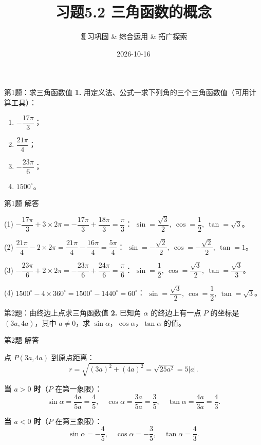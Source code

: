 \documentclass[10pt,aspectratio=169,serif]{beamer}
\title[习题5.2]{习题5.2 三角函数的概念}
\subtitle{复习巩固 \& 综合运用 \& 拓广探索}
\author{}
\institute{}
\date{2026-10-16}
\begin{document}
\begin{frame}
  \titlepage
\end{frame}

\begin{frame}[t]{第1题：求三角函数值}
\textbf{1.} 用定义法、公式一求下列角的三个三角函数值（可用计算工具）：
\begin{enumerate}
  \item $-\dfrac{17\pi}{3}$；
  \item $\dfrac{21\pi}{4}$；
  \item $-\dfrac{23\pi}{6}$；
  \item $1500^\circ$。
\end{enumerate}
\end{frame}

\begin{frame}[t]{第1题 解答}
\begin{tcolorbox}[colback=orange!10,colframe=orange,title=\textbf{解}]
\small
(1) $-\dfrac{17\pi}{3}+3\times 2\pi=-\dfrac{17\pi}{3}+\dfrac{18\pi}{3}=\dfrac{\pi}{3}$：
$\sin=\dfrac{\sqrt{3}}{2},\ \cos=\dfrac{1}{2},\ \tan=\sqrt{3}$。

(2) $\dfrac{21\pi}{4}-2\times 2\pi=\dfrac{21\pi}{4}-\dfrac{16\pi}{4}=\dfrac{5\pi}{4}$：
$\sin=-\dfrac{\sqrt{2}}{2},\ \cos=-\dfrac{\sqrt{2}}{2},\ \tan=1$。

(3) $-\dfrac{23\pi}{6}+2\times 2\pi=-\dfrac{23\pi}{6}+\dfrac{24\pi}{6}=\dfrac{\pi}{6}$：
$\sin=\dfrac{1}{2},\ \cos=\dfrac{\sqrt{3}}{2},\ \tan=\dfrac{\sqrt{3}}{3}$。

(4) $1500^\circ-4\times 360^\circ=1500^\circ-1440^\circ=60^\circ$：
$\sin=\dfrac{\sqrt{3}}{2},\ \cos=\dfrac{1}{2},\ \tan=\sqrt{3}$。
\end{tcolorbox}
\end{frame}

\begin{frame}[t]{第2题：由终边上点求三角函数值}
\textbf{2.} 已知角 $\alpha$ 的终边上有一点 $P$ 的坐标是 $(3a,4a)$，其中 $a\neq 0$，求 $\sin\alpha$，$\cos\alpha$，$\tan\alpha$ 的值。
\end{frame}

\begin{frame}[t]{第2题 解答}
\begin{tcolorbox}[colback=orange!10,colframe=orange,title=\textbf{解}]
点 $P(3a,4a)$ 到原点距离：
\[
r = \sqrt{(3a)^2+(4a)^2} = \sqrt{25a^2} = 5|a|.
\]

\vspace{0.5em}
\textbf{当 $a>0$ 时}（$P$ 在第一象限）：
\[
\sin\alpha=\frac{4a}{5a}=\frac{4}{5},\quad
\cos\alpha=\frac{3a}{5a}=\frac{3}{5},\quad
\tan\alpha=\frac{4a}{3a}=\frac{4}{3}.
\]

\vspace{0.3em}
\textbf{当 $a<0$ 时}（$P$ 在第三象限）：
\[
\sin\alpha=-\frac{4}{5},\quad
\cos\alpha=-\frac{3}{5},\quad
\tan\alpha=\frac{4}{3}.
\]
\end{tcolorbox}
\end{frame}
\end{document}
